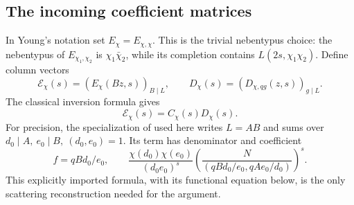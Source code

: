 \subsection{The incoming coefficient matrices}

In Young's notation set \(E_\chi=E_{\chi,\chi}\). This is the trivial
nebentypus choice: the nebentypus of \(E_{\chi_1,\chi_2}\) is
\(\chi_1\bar\chi_2\), while its completion contains
\(L(2s,\chi_1\chi_2)\). Define column vectors
\[
 \mathcal E_\chi(s)=(E_\chi(Bz,s))_{B\mid L},\qquad
 D_\chi(s)=(D_{\chi,qg}(z,s))_{g\mid L}.
\]
The classical inversion formula gives
\begin{equation}\label{eq:incoming}
 \mathcal E_\chi(s)=C_\chi(s)D_\chi(s).
\end{equation}
For precision, the specialization of
\citet[equation (7.3)]{Young2019} used here writes \(L=AB\)
and sums over \(d_0\mid A,\ e_0\mid B,\ (d_0,e_0)=1\).
Its term has denominator and coefficient
\begin{equation}\label{eq:Young-summand}
 f=qBd_0/e_0,\qquad
 \frac{\chi(d_0)\chi(e_0)}{(d_0e_0)^s}
 \left(\frac{N}{(qBd_0/e_0,qAe_0/d_0)}\right)^s .
\end{equation}
This explicitly imported formula, with its functional equation below,
is the only scattering reconstruction needed for the argument.

